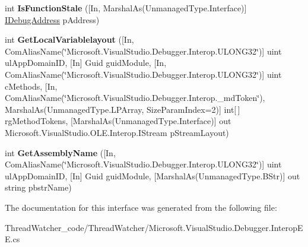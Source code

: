 \begin{DoxyCompactItemize}
\item 
\hypertarget{interface_microsoft_1_1_visual_studio_1_1_debugger_1_1_interop_e_e_1_1_i_debug_com_plus_symbol_provider_aa3df3af84121d1c30749efc8b9473906}{int {\bfseries Is\+Function\+Stale} (\mbox{[}In, Marshal\+As(Unmanaged\+Type.\+Interface)\mbox{]} \hyperlink{interface_microsoft_1_1_visual_studio_1_1_debugger_1_1_interop_e_e_1_1_i_debug_address}{I\+Debug\+Address} p\+Address)}\label{interface_microsoft_1_1_visual_studio_1_1_debugger_1_1_interop_e_e_1_1_i_debug_com_plus_symbol_provider_aa3df3af84121d1c30749efc8b9473906}

\item 
\hypertarget{interface_microsoft_1_1_visual_studio_1_1_debugger_1_1_interop_e_e_1_1_i_debug_com_plus_symbol_provider_aa916d24f52fc801da1ccc88c3d35addf}{int {\bfseries Get\+Local\+Variablelayout} (\mbox{[}In, Com\+Alias\+Name(\char`\"{}Microsoft.\+Visual\+Studio.\+Debugger.\+Interop.\+U\+L\+O\+N\+G32\char`\"{})\mbox{]} uint ul\+App\+Domain\+I\+D, \mbox{[}In\mbox{]} Guid guid\+Module, \mbox{[}In, Com\+Alias\+Name(\char`\"{}Microsoft.\+Visual\+Studio.\+Debugger.\+Interop.\+U\+L\+O\+N\+G32\char`\"{})\mbox{]} uint c\+Methods, \mbox{[}In, Com\+Alias\+Name(\char`\"{}Microsoft.\+Visual\+Studio.\+Debugger.\+Interop.\+\_\+md\+Token\char`\"{}), Marshal\+As(Unmanaged\+Type.\+L\+P\+Array, Size\+Param\+Index=2)\mbox{]} int\mbox{[}$\,$\mbox{]} rg\+Method\+Tokens, \mbox{[}Marshal\+As(Unmanaged\+Type.\+Interface)\mbox{]} out Microsoft.\+Visual\+Studio.\+O\+L\+E.\+Interop.\+I\+Stream p\+Stream\+Layout)}\label{interface_microsoft_1_1_visual_studio_1_1_debugger_1_1_interop_e_e_1_1_i_debug_com_plus_symbol_provider_aa916d24f52fc801da1ccc88c3d35addf}

\item 
\hypertarget{interface_microsoft_1_1_visual_studio_1_1_debugger_1_1_interop_e_e_1_1_i_debug_com_plus_symbol_provider_a3fc593a0258225039195a11e5adfbe91}{int {\bfseries Get\+Assembly\+Name} (\mbox{[}In, Com\+Alias\+Name(\char`\"{}Microsoft.\+Visual\+Studio.\+Debugger.\+Interop.\+U\+L\+O\+N\+G32\char`\"{})\mbox{]} uint ul\+App\+Domain\+I\+D, \mbox{[}In\mbox{]} Guid guid\+Module, \mbox{[}Marshal\+As(Unmanaged\+Type.\+B\+Str)\mbox{]} out string pbstr\+Name)}\label{interface_microsoft_1_1_visual_studio_1_1_debugger_1_1_interop_e_e_1_1_i_debug_com_plus_symbol_provider_a3fc593a0258225039195a11e5adfbe91}

\end{DoxyCompactItemize}


The documentation for this interface was generated from the following file\+:\begin{DoxyCompactItemize}
\item 
Thread\+Watcher\+\_\+code/\+Thread\+Watcher/Microsoft.\+Visual\+Studio.\+Debugger.\+Interop\+E\+E.\+cs\end{DoxyCompactItemize}
